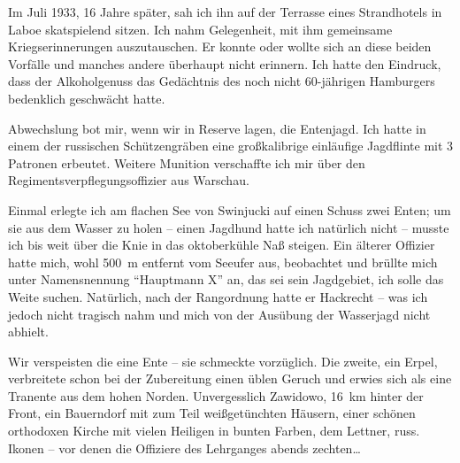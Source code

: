 \documentclass[a5paper,pagesize,10pt,twoside=true]{scrbook}
\begin{document}
Im Juli 1933, 16 Jahre später, sah ich ihn auf der Terrasse eines Strandhotels in Laboe skatspielend sitzen. Ich nahm Gelegenheit, mit ihm gemeinsame Kriegserinnerungen auszutauschen. Er konnte oder wollte sich an diese beiden Vorfälle und manches andere überhaupt nicht erinnern. Ich hatte den Eindruck, dass der Alkoholgenuss das Gedächtnis des noch nicht 60-jährigen Hamburgers bedenklich geschwächt hatte.

Abwechslung bot mir, wenn wir in Reserve lagen, die Entenjagd. Ich hatte in einem der russischen Schützengräben eine großkalibrige einläufige Jagdflinte mit 3 Patronen erbeutet. Weitere Munition verschaffte ich mir über den Regimentsverpflegungsoffizier aus Warschau.

Einmal erlegte ich am flachen See von Swinjucki auf einen Schuss zwei Enten; um sie aus dem Wasser zu holen -- einen Jagdhund hatte ich natürlich nicht -- musste ich bis weit über die Knie in das oktoberkühle Naß steigen. Ein älterer Offizier hatte mich, wohl 500~m entfernt vom Seeufer aus, beobachtet und brüllte mich unter Namensnennung \enquote{Hauptmann X} an, das sei sein Jagdgebiet, ich solle das Weite suchen. Natürlich, nach der Rangordnung hatte er Hackrecht -- was ich jedoch nicht tragisch nahm und mich von der Ausübung der Wasserjagd nicht abhielt.

Wir verspeisten die eine Ente -- sie schmeckte vorzüglich. Die zweite, ein Erpel, verbreitete schon bei der Zubereitung einen üblen Geruch und erwies sich als eine Tranente aus dem hohen Norden.
Unvergesslich Zawidowo, 16~km hinter der Front, ein Bauerndorf mit zum Teil weißgetünchten Häusern, einer schönen orthodoxen Kirche mit vielen Heiligen in bunten Farben, dem Lettner, russ. Ikonen -- vor denen die Offiziere des Lehrganges abends zechten\dots
\end{document}
